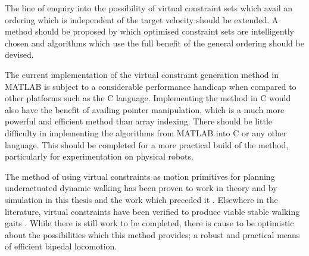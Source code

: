 The line of enquiry into the possibility of virtual constraint sets which avail an ordering which is independent of the target velocity should be extended. A method should be proposed by which optimised constraint sets are intelligently chosen and algorithms which use the full benefit of the general ordering should be devised.

The current implementation of the virtual constraint generation method in MATLAB is subject to a considerable performance handicap when compared to other platforms such as the C language. Implementing the method in C would also have the benefit of availing pointer manipulation, which is a much more powerful and efficient method than array indexing. There should be little difficulty in implementing the algorithms from MATLAB into C or any other language. This should be completed for a more practical build of the method, particularly for experimentation on physical robots.

The method of using virtual constraints as motion primitives for planning underactuated dynamic walking has been proven to work in theory and by simulation in this thesis and the work which preceded it \cite{manchester13planning}. Elsewhere in the literature, virtual constraints have been verified to produce viable stable walking gaits \cite{byl2008approximate, sreenath2011compliant}. While there is still work to be completed, there is cause to be optimistic about the possibilities which this method provides; a robust and practical means of efficient bipedal locomotion.